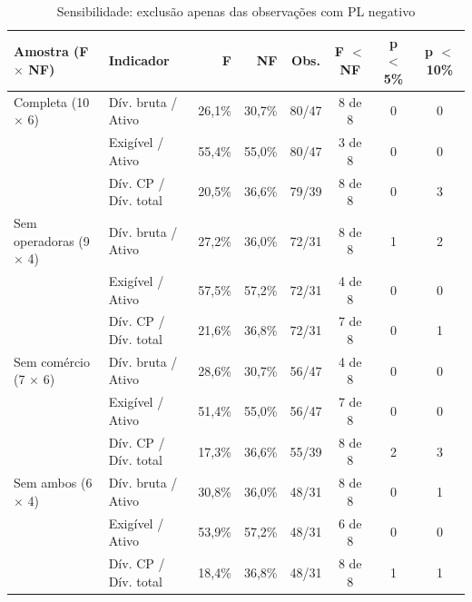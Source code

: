 \begin{table}[htb]
\caption{Sensibilidade: exclusão apenas das observações com PL negativo}\label{tab:banca-sopl}
\centering\footnotesize\setlength{\tabcolsep}{4pt}
\begin{tabular}{llrrcccc}
\toprule
Amostra (F $\times$ NF) & Indicador & F & NF & Obs. & F $<$ NF & p $<$ 5\% & p $<$ 10\% \\
\midrule
Completa (10 $\times$ 6) & Dív. bruta / Ativo & 26,1\% & 30,7\% & 80/47 & 8 de 8 & 0 & 0 \\
 & Exigível / Ativo & 55,4\% & 55,0\% & 80/47 & 3 de 8 & 0 & 0 \\
 & Dív. CP / Dív. total & 20,5\% & 36,6\% & 79/39 & 8 de 8 & 0 & 3 \\
Sem operadoras (9 $\times$ 4) & Dív. bruta / Ativo & 27,2\% & 36,0\% & 72/31 & 8 de 8 & 1 & 2 \\
 & Exigível / Ativo & 57,5\% & 57,2\% & 72/31 & 4 de 8 & 0 & 0 \\
 & Dív. CP / Dív. total & 21,6\% & 36,8\% & 72/31 & 7 de 8 & 0 & 1 \\
Sem comércio (7 $\times$ 6) & Dív. bruta / Ativo & 28,6\% & 30,7\% & 56/47 & 4 de 8 & 0 & 0 \\
 & Exigível / Ativo & 51,4\% & 55,0\% & 56/47 & 7 de 8 & 0 & 0 \\
 & Dív. CP / Dív. total & 17,3\% & 36,6\% & 55/39 & 8 de 8 & 2 & 3 \\
Sem ambos (6 $\times$ 4) & Dív. bruta / Ativo & 30,8\% & 36,0\% & 48/31 & 8 de 8 & 0 & 1 \\
 & Exigível / Ativo & 53,9\% & 57,2\% & 48/31 & 6 de 8 & 0 & 0 \\
 & Dív. CP / Dív. total & 18,4\% & 36,8\% & 48/31 & 8 de 8 & 1 & 1 \\
\bottomrule
\end{tabular}
\end{table}
